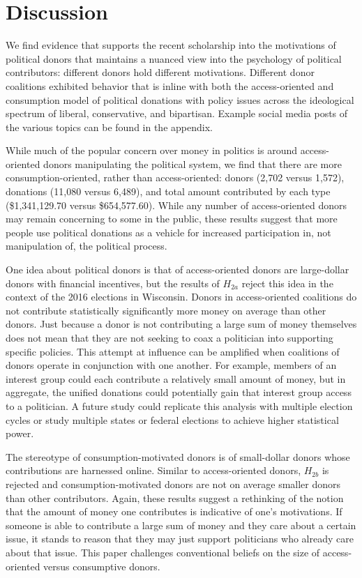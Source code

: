 \documentclass[12pt,]{article}
\begin{document}
\hypertarget{discussion}{%
\section{Discussion}\label{discussion}}

We find evidence that supports the recent scholarship into the
motivations of political donors that maintains a nuanced view into the
psychology of political contributors: different donors hold different
motivations. Different donor coalitions exhibited behavior that is
inline with both the access-oriented and consumption model of political
donations with policy issues across the ideological spectrum of liberal,
conservative, and bipartisan. Example social media posts of the various
topics can be found in the appendix.

While much of the popular concern over money in politics is around
access-oriented donors manipulating the political system, we find that
there are more consumption-oriented, rather than access-oriented: donors
(2,702 versus 1,572), donations (11,080 versus 6,489), and total amount
contributed by each type (\$1,341,129.70 versus \$654,577.60). While any
number of access-oriented donors may remain concerning to some in the
public, these results suggest that more people use political donations
as a vehicle for increased participation in, not manipulation of, the
political process.

One idea about political donors is that of access-oriented donors are
large-dollar donors with financial incentives, but the results of
\(H_{2a}\) reject this idea in the context of the 2016 elections in
Wisconsin. Donors in access-oriented coalitions do not contribute
statistically significantly more money on average than other donors.
Just because a donor is not contributing a large sum of money themselves
does not mean that they are not seeking to coax a politician into
supporting specific policies. This attempt at influence can be amplified
when coalitions of donors operate in conjunction with one another. For
example, members of an interest group could each contribute a relatively
small amount of money, but in aggregate, the unified donations could
potentially gain that interest group access to a politician. A future
study could replicate this analysis with multiple election cycles or
study multiple states or federal elections to achieve higher statistical
power.

The stereotype of consumption-motivated donors is of small-dollar donors
whose contributions are harnessed online. Similar to access-oriented
donors, \(H_{2b}\) is rejected and consumption-motivated donors are not
on average smaller donors than other contributors. Again, these results
suggest a rethinking of the notion that the amount of money one
contributes is indicative of one's motivations. If someone is able to
contribute a large sum of money and they care about a certain issue, it
stands to reason that they may just support politicians who already care
about that issue. This paper challenges conventional beliefs on the size
of access-oriented versus consumptive donors.
\end{document}
